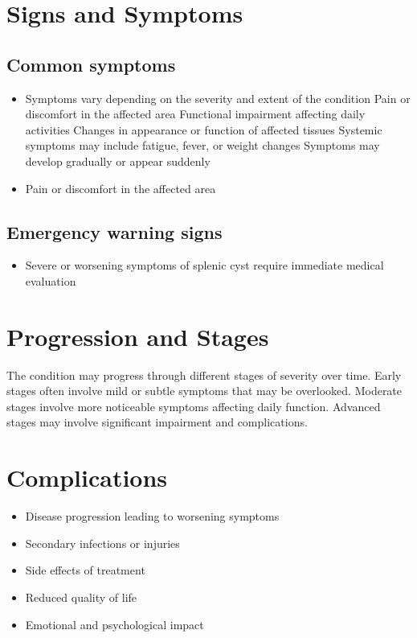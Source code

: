 \section{Signs and Symptoms}

\subsection{Common symptoms}
\begin{itemize}[noitemsep]
  \item Symptoms vary depending on the severity and extent of the condition Pain or discomfort in the affected area Functional impairment affecting daily activities Changes in appearance or function of affected tissues Systemic symptoms may include fatigue, fever, or weight changes Symptoms may develop gradually or appear suddenly
  \item Pain or discomfort in the affected area
  \end{itemize}

\subsection{Emergency warning signs}
\begin{itemize}[noitemsep]
  \item Severe or worsening symptoms of splenic cyst require immediate medical evaluation
\end{itemize}
\section{Progression and Stages}
The condition may progress through different stages of severity over time. Early stages often involve mild or subtle symptoms that may be overlooked. Moderate stages involve more noticeable symptoms affecting daily function. Advanced stages may involve significant impairment and complications.
\section{Complications}
\begin{itemize}[noitemsep]
  \item Disease progression leading to worsening symptoms
  \item Secondary infections or injuries
  \item Side effects of treatment
  \item Reduced quality of life
  \item Emotional and psychological impact
\end{itemize}
